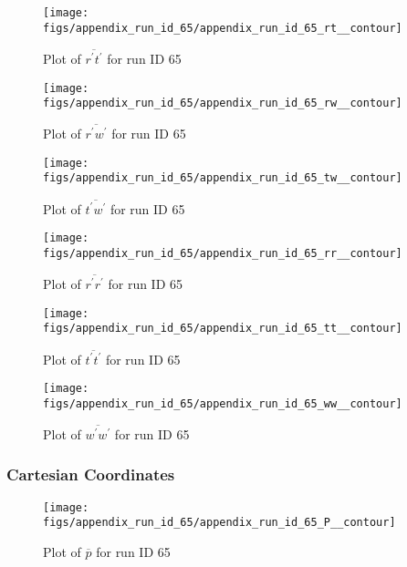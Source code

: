 \begin{figure}[H]
\centering
\texttt{[image: figs/appendix\_run\_id\_65/appendix\_run\_id\_65\_rt\_\_contour]}
\caption{Plot of $\overline{r^\prime t^\prime}$ for run ID 65}
\label{fig:appendix_run_id_65_rt__contour}
\end{figure}


\begin{figure}[H]
\centering
\texttt{[image: figs/appendix\_run\_id\_65/appendix\_run\_id\_65\_rw\_\_contour]}
\caption{Plot of $\overline{r^\prime w^\prime}$ for run ID 65}
\label{fig:appendix_run_id_65_rw__contour}
\end{figure}


\begin{figure}[H]
\centering
\texttt{[image: figs/appendix\_run\_id\_65/appendix\_run\_id\_65\_tw\_\_contour]}
\caption{Plot of $\overline{t^\prime w^\prime}$ for run ID 65}
\label{fig:appendix_run_id_65_tw__contour}
\end{figure}


\begin{figure}[H]
\centering
\texttt{[image: figs/appendix\_run\_id\_65/appendix\_run\_id\_65\_rr\_\_contour]}
\caption{Plot of $\overline{r^\prime r^\prime}$ for run ID 65}
\label{fig:appendix_run_id_65_rr__contour}
\end{figure}


\begin{figure}[H]
\centering
\texttt{[image: figs/appendix\_run\_id\_65/appendix\_run\_id\_65\_tt\_\_contour]}
\caption{Plot of $\overline{t^\prime t^\prime}$ for run ID 65}
\label{fig:appendix_run_id_65_tt__contour}
\end{figure}


\begin{figure}[H]
\centering
\texttt{[image: figs/appendix\_run\_id\_65/appendix\_run\_id\_65\_ww\_\_contour]}
\caption{Plot of $\overline{w^\prime w^\prime}$ for run ID 65}
\label{fig:appendix_run_id_65_ww__contour}
\end{figure}


\subsubsection{Cartesian Coordinates}
\begin{figure}[H]
\centering
\texttt{[image: figs/appendix\_run\_id\_65/appendix\_run\_id\_65\_P\_\_contour]}
\caption{Plot of $\overline{p}$ for run ID 65}
\label{fig:appendix_run_id_65_P__contour}
\end{figure}


